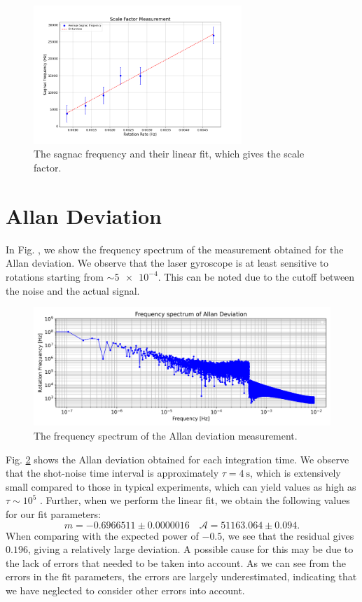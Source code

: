 \documentclass[a4paper]{report}
\numberwithin{equation}{section}
\begin{document}
\begin{figure}[htpb]
	\centering
	\includegraphics[width=0.7\textwidth]{scale-factor}
	\caption{The sagnac frequency and their linear fit, which gives the scale factor.}
	\label{fig:scale-factor}
\end{figure}


\section{Allan Deviation}

In Fig. , we show the frequency spectrum of the measurement obtained for the Allan deviation. We observe that the laser gyroscope is 
at least sensitive to rotations starting from $\sim \num{5e-4}$. This can be noted due to the cutoff between the noise and the 
actual signal. 

\begin{figure}[h!]
	\centering
	\includegraphics[width=0.8\columnwidth]{allan_fs.png}
	\caption{The frequency spectrum of the Allan deviation measurement.}
	\label{fig:allan}
\end{figure}

Fig. \ref{fig:allan} shows the Allan deviation obtained for each integration time.
We observe that the shot-noise time interval is approximately $\tau = \SI{4}{\second}$, which is extensively small 
compared to those in typical experiments, which can yield values as high as $\tau \sim 10^{5}$ \cite{Groh2021}. 
Further, when we perform the linear fit, we obtain the following values for our fit parameters: 
\begin{equation}
	m = -0.6966511 \pm 0.0000016 \quad \mathcal{A} = 51163.064 \pm 0.094. 
\end{equation}
When comparing with the expected power of $-0.5$, we see that the residual gives $0.196$, giving a relatively large deviation. 
A possible cause for this may be due to the lack of errors that needed to be taken into account. As we can see from the errors in 
the fit parameters, the errors are largely underestimated, indicating that we have neglected to consider other errors into account. 
\end{document}
